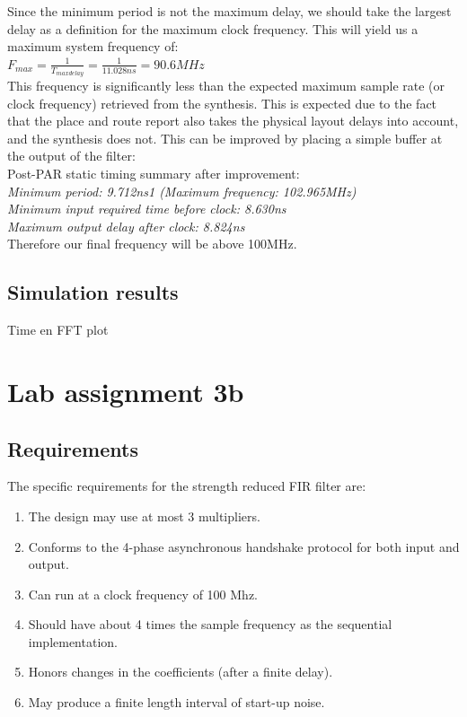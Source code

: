 \documentclass[a4paper,twoside,11pt, fleqn]{article}
\begin{document}
Since the minimum period is not the maximum delay, we should take the largest 
delay as a definition for the maximum clock frequency. This will yield us a maximum system frequency of:\\

$F_{max} = \frac{1}{T_{max delay}} = \frac{1}{11.028ns} = 90.6MHz$\\

This frequency is significantly less than the expected maximum sample rate (or clock frequency) retrieved from the synthesis. This is expected due to the fact that the place and route report also takes the physical layout delays into account, and the synthesis does not. This can be improved by placing a simple buffer at the output of the filter:\\

Post-PAR static timing summary after improvement:\\
\textit{Minimum period:   9.712ns{1}   (Maximum frequency: 102.965MHz)\\
   Minimum input required time before clock:   8.630ns\\
   Maximum output delay after clock:   8.824ns}\\

Therefore our final frequency will be above 100MHz.


\subsection{Simulation results}
Time en FFT plot


\newpage
\section{Lab assignment 3b}
\subsection{Requirements}
The specific requirements for the strength reduced FIR filter are:
\begin{enumerate}
\item The design may use at most 3 multipliers.
\item Conforms to the 4-phase asynchronous handshake protocol for both input and output.
\item Can run at a clock frequency of 100 Mhz.
\item Should have about 4 times the sample frequency as the sequential implementation.
\item Honors changes in the coefficients (after a finite delay).
\item May produce a finite length interval of start-up noise.
\end{enumerate}
\end{document}
